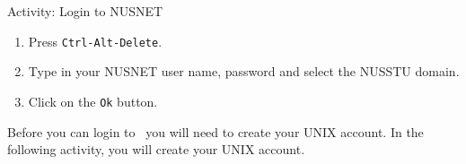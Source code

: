 \begin{frame}{Activity: Login to NUSNET}
\begin{enumerate}
\item Press \texttt{Ctrl-Alt-Delete}.
\item Type in your NUSNET user name, password and select the NUSSTU domain.  
\item Click on the \texttt{Ok} button.  
\end{enumerate}
\end{frame}

Before you can login to \sunfire\, you will need to create your UNIX account.
In the following activity, you will create your UNIX account.  

